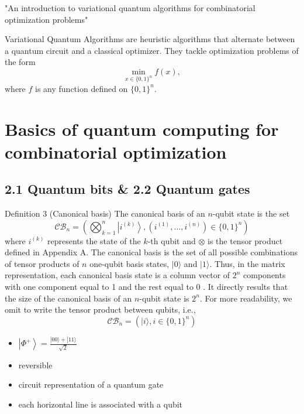 "An introduction to variational quantum algorithms for combinatorial optimization problems" \cite{grange2023introduction}

\vspace{10pt}

Variational Quantum Algorithms are heuristic algorithms that alternate between a quantum circuit and a classical optimizer. They tackle optimization problems of the form
$$
\min _{x \in\{0,1\}^n} f(x),
$$
where $f$ is any function defined on $\{0,1\}^n$. 


\section{Basics of quantum computing for combinatorial optimization}

\subsection{2.1 Quantum bits \& 2.2 Quantum gates}

Definition 3 (Canonical basis) The canonical basis of an $n$-qubit state is the set
$$
\mathcal{C B}_{n}=\left(\bigotimes_{k=1}^{n}\left|i^{(k)}\right\rangle,\left(i^{(1)}, \ldots, i^{(n)}\right) \in\{0,1\}^{n}\right)
$$
where $i^{(k)}$ represents the state of the $k$-th qubit and $\otimes$ is the tensor product defined in Appendix A. The canonical basis is the set of all possible combinations of tensor products of $n$ one-qubit basis states, $|0\rangle$ and $|1\rangle$. Thus, in the matrix representation, each canonical basis state is a column vector of $2^{n}$ components with one component equal to 1 and the rest equal to 0 . It directly results that the size of the canonical basis of an $n$-qubit state is $2^{n}$. For more readability, we omit to write the tensor product between qubits, i.e.,
$$
\mathcal{C B}_{n}=\left(|i\rangle, i \in\{0,1\}^{n}\right)
$$
\begin{remark}
    \begin{itemize}
        \item $\left|\Phi^{+}\right\rangle=\frac{|00\rangle+|11\rangle}{\sqrt{2}}$
        \item reversible %
        \item circuit representation of a quantum gate
        \item each horizontal line is associated with a qubit
    \end{itemize}
\end{remark}


